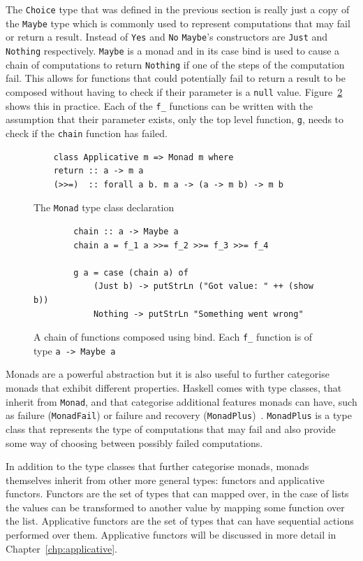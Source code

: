The \texttt{Choice} type that was defined in the previous section is really just a copy of the \texttt{Maybe} type which is commonly used to represent computations that may fail or return a result. Instead of \texttt{Yes} and \texttt{No} \texttt{Maybe}'s constructors are \texttt{Just} and \texttt{Nothing} respectively. \texttt{Maybe} is a monad and in its case bind is used to cause a chain of computations to return \texttt{Nothing} if one of the steps of the computation fail. This allows for functions that could potentially fail to return a result to be composed without having to check if their parameter is a \texttt{null} value. Figure~\ref{maybeChain} shows this in practice. Each of the \texttt{f\_} functions can be written with the assumption that their parameter exists, only the top level function, \texttt{g}, needs to check if the \texttt{chain} function has failed.

\begin{figure}[t]
	\begin{lstlisting}
	class Applicative m => Monad m where
	return :: a -> m a
	(>>=)  :: forall a b. m a -> (a -> m b) -> m b
	\end{lstlisting}
	\caption{The \texttt{Monad} type class declaration}
	\label{monadTC}
\end{figure}

\begin{figure}[t]
	\begin{lstlisting}
		chain :: a -> Maybe a
		chain a = f_1 a >>= f_2 >>= f_3 >>= f_4
		
		g a = case (chain a) of
			(Just b) -> putStrLn ("Got value: " ++ (show b))
			Nothing -> putStrLn "Something went wrong"
	\end{lstlisting}
	\caption{A chain of functions composed using bind. Each \texttt{f\_} function is of type \texttt{a -> Maybe a}}
	\label{maybeChain}
\end{figure}

Monads are a powerful abstraction but it is also useful to further categorise monads that exhibit different properties. Haskell comes with type classes, that inherit from \texttt{Monad}, and that categorise additional features monads can have, such as failure (\texttt{MonadFail}) or failure and recovery (\texttt{MonadPlus})~\citep{typeclassopedia}. \texttt{MonadPlus} is a type class that represents the type of computations that may fail and also provide some way of choosing between possibly failed computations. 

In addition to the type classes that further categorise monads, monads themselves inherit from other more general types: functors and applicative functors. Functors are the set of types that can mapped over, in the case of lists the values can be transformed to another value by mapping some function over the list. Applicative functors are the set of types that can have sequential actions performed over them. Applicative functors will be discussed in more detail in Chapter~\ref{chp:applicative}. 

